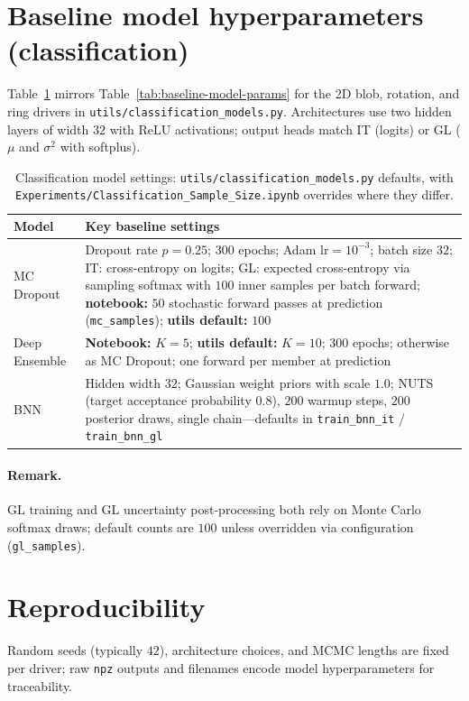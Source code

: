 \section{Baseline model hyperparameters (classification)}
\label{sec:baseline-model-params-clf}

Table~\ref{tab:baseline-model-params-clf} mirrors Table~\ref{tab:baseline-model-params} for the 2D blob, rotation, and ring drivers in \texttt{utils/classification\_models.py}. Architectures use two hidden layers of width $32$ with ReLU activations; output heads match IT (logits) or GL ($\mu$ and $\sigma^2$ with softplus).

\begin{table}[htbp]
  \centering
  \caption{Classification model settings: \texttt{utils/classification\_models.py} defaults, with \texttt{Experiments/Classification\_Sample\_Size.ipynb} overrides where they differ.}
  \label{tab:baseline-model-params-clf}
  \begin{tabular}{lp{9.2cm}}
    \toprule
    Model & Key baseline settings \\
    \midrule
    MC Dropout & Dropout rate $p=0.25$; $300$ epochs; Adam $\mathrm{lr}=10^{-3}$; batch size $32$; IT: cross-entropy on logits; GL: expected cross-entropy via sampling softmax with $100$ inner samples per batch forward; \textbf{notebook:} $50$ stochastic forward passes at prediction (\texttt{mc\_samples}); \textbf{utils default:} $100$ \\
    Deep Ensemble & \textbf{Notebook:} $K=5$; \textbf{utils default:} $K=10$; $300$ epochs; otherwise as MC Dropout; one forward per member at prediction \\
    BNN & Hidden width $32$; Gaussian weight priors with scale $1.0$; NUTS (target acceptance probability $0.8$), $200$ warmup steps, $200$ posterior draws, single chain---defaults in \texttt{train\_bnn\_it} / \texttt{train\_bnn\_gl} \\
    \bottomrule
  \end{tabular}
\end{table}

\paragraph{Remark.}
GL training and GL uncertainty post-processing both rely on Monte Carlo softmax draws; default counts are $100$ unless overridden via configuration (\texttt{gl\_samples}).

\section{Reproducibility}
\label{sec:exp-repro}

Random seeds (typically $42$), architecture choices, and MCMC lengths are fixed per driver; raw \texttt{npz} outputs and filenames encode model hyperparameters for traceability.
